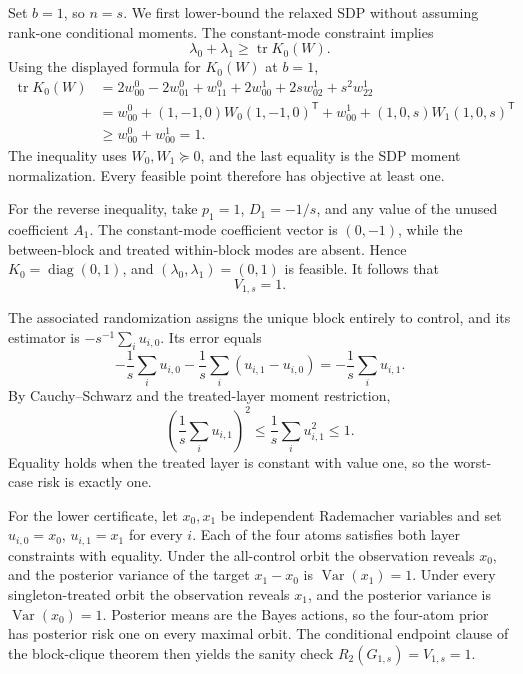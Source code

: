 Set \(b=1\), so \(n=s\).  We first lower-bound the relaxed SDP without assuming rank-one conditional moments.  The constant-mode constraint implies
\[
\lambda_0+\lambda_1\geq\operatorname{tr}K_0(W).
\]
Using the displayed formula for \(K_0(W)\) at \(b=1\),
\[
\begin{aligned}
\operatorname{tr}K_0(W)
&=2w^0_{00}-2w^0_{01}+w^0_{11}
  +2w^1_{00}+2sw^1_{02}+s^2w^1_{22}\\
&=w^0_{00}+(1,-1,0)W_0(1,-1,0)^{\mathsf T}
  +w^1_{00}+(1,0,s)W_1(1,0,s)^{\mathsf T}\\
&\geq w^0_{00}+w^1_{00}=1.
\end{aligned}
\]
The inequality uses \(W_0,W_1\succeq0\), and the last equality is the SDP moment normalization.  Every feasible point therefore has objective at least one.

For the reverse inequality, take \(p_1=1\), \(D_1=-1/s\), and any value of the unused coefficient \(A_1\).  The constant-mode coefficient vector is \((0,-1)\), while the between-block and treated within-block modes are absent.  Hence \(K_0=\operatorname{diag}(0,1)\), and \((\lambda_0,\lambda_1)=(0,1)\) is feasible.  It follows that
\[
V_{1,s}=1.
\]

The associated randomization assigns the unique block entirely to control, and its estimator is \(-s^{-1}\sum_i u_{i,0}\).  Its error equals
\[
-\frac1s\sum_i u_{i,0}
-\frac1s\sum_i(u_{i,1}-u_{i,0})
=-\frac1s\sum_i u_{i,1}.
\]
By Cauchy--Schwarz and the treated-layer moment restriction,
\[
\left(\frac1s\sum_i u_{i,1}\right)^2
\leq\frac1s\sum_i u_{i,1}^2
\leq1.
\]
Equality holds when the treated layer is constant with value one, so the worst-case risk is exactly one.

For the lower certificate, let \(x_0,x_1\) be independent Rademacher variables and set \(u_{i,0}=x_0\), \(u_{i,1}=x_1\) for every \(i\).  Each of the four atoms satisfies both layer constraints with equality.  Under the all-control orbit the observation reveals \(x_0\), and the posterior variance of the target \(x_1-x_0\) is \(\operatorname{Var}(x_1)=1\).  Under every singleton-treated orbit the observation reveals \(x_1\), and the posterior variance is \(\operatorname{Var}(x_0)=1\).  Posterior means are the Bayes actions, so the four-atom prior has posterior risk one on every maximal orbit.  The conditional endpoint clause of the block-clique theorem then yields the sanity check \(R_2(G_{1,s})=V_{1,s}=1\).